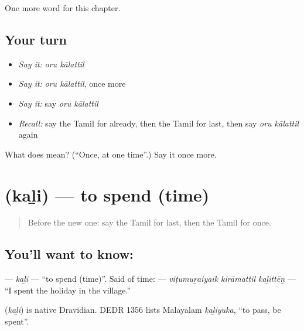 \begin{grammarlens}[title={What you've built}]
One more word for this chapter.
\end{grammarlens}

\subsection*{Your turn}
\begin{itemize}
\raggedright
  \item \emph{Say it:} \emph{oru kālattil}
  \item \emph{Say it:} \emph{oru kālattil}, once more
  \item \emph{Say it:} say \emph{oru kālattil}
  \item \emph{Recall:} say the Tamil for already, then the Tamil for last, then say \emph{oru kālattil} again
\end{itemize}

\begin{tcolorbox}[breakable,colback=teal!4,colframe=teal!35!black,title={Before you move on}]
What does   mean? (\textquotedblleft{}Once, at one time\textquotedblright{}.) Say it once more.
\end{tcolorbox}
\section[\texorpdfstring{\ta{கழி} (kaḻi)}{கழி (kaḻi)}]{ (kaḻi) — to spend (time)}

\label{lesson:TA-C158-kali}



\begin{quote}
Before the new one: say the Tamil for last, then the Tamil for once.
\end{quote}

\subsection*{You'll want to know: }
\textbf{} — \emph{kaḻi} — \textquotedblleft{}to spend (time)\textquotedblright{}. Said of time: \textbf{  } — \emph{viṭumuṟaiyaik kirāmattil kaḻittēṉ} — \textquotedblleft{}I spent the holiday in the village.\textquotedblright{}

\begin{cousinweb}
\textbf{} (\emph{kaḻi}) is native Dravidian. DEDR 1356 lists Malayalam \emph{kaḻiyuka}, \textquotedblleft{}to pass, be spent\textquotedblright{}.
\end{cousinweb}

